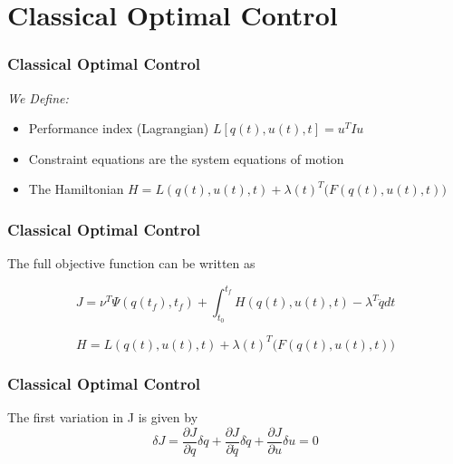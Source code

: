 \documentclass{beamer}
\begin{document}
\section{Classical Optimal Control}


\begin{frame}
\frametitle{Classical Optimal Control}

\textit{We Define:}
\begin{itemize}
	\item Performance index (Lagrangian) $ L[q(t),u(t),t] = u^T I u $
	\item Constraint equations are the system equations of motion
	\item The Hamiltonian $H = L(q(t),u(t),t) + \lambda(t)^T \big( F(q(t),u(t),t) \big)$ 

\end{itemize}

\end{frame}



\begin{frame}
\frametitle{Classical Optimal Control}

The full objective function can be written as

\begin{equation}
    J = \nu^T \Psi ( q(t_f),t_f ) + \int_{t_0}^{t_f}  H(q(t),u(t),t) - \lambda^T \ddot q  dt
\end{equation}

\begin{equation}
H = L(q(t),u(t),t) + \lambda(t)^T \big( F(q(t),u(t),t) \big)
\end{equation}

\end{frame}


\begin{frame}
\frametitle{Classical Optimal Control}

The first variation in J is given by\\

\begin{equation}
    \delta  J = \frac{\partial J}{\partial q} \delta q + \frac{\partial J}{\partial \dot q} \delta \dot q   +  \frac{\partial J}{\partial u} \delta u = 0
\end{equation}


\end{frame}
\end{document}
